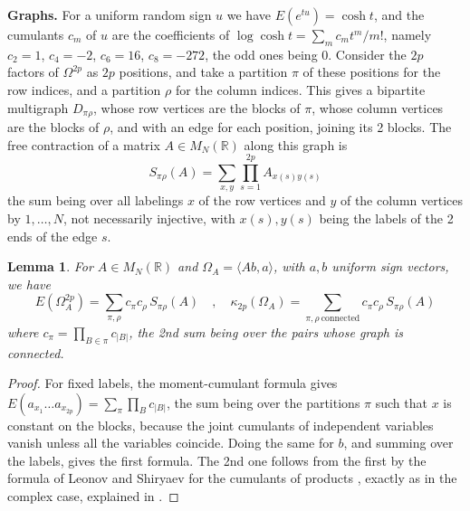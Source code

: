 \documentclass[11pt,a4paper]{article}
\newtheorem{lem}[thm]{Lemma}
\theoremstyle{remark}
\begin{document}
\noindent\textbf{Graphs.}
For a uniform random sign $u$ we have $E(e^{tu})=\cosh t$, and the cumulants $c_m$ of $u$ are the coefficients of $\log\cosh t=\sum_mc_mt^m/m!$, namely $c_2=1$, $c_4=-2$, $c_6=16$, $c_8=-272$, the odd ones being 0. Consider the $2p$ factors of $\Omega^{2p}$ as $2p$ positions, and take a partition $\pi$ of these positions for the row indices, and a partition $\rho$ for the column indices. This gives a bipartite multigraph $D_{\pi\rho}$, whose row vertices are the blocks of $\pi$, whose column vertices are the blocks of $\rho$, and with an edge for each position, joining its 2 blocks. The free contraction of a matrix $A\in M_N(\mathbb R)$ along this graph is
\[
 S_{\pi\rho}(A)=\sum_{x,y}\prod_{s=1}^{2p}A_{x(s)y(s)}
\]
the sum being over all labelings $x$ of the row vertices and $y$ of the column vertices by $1,\ldots,N$, not necessarily injective, with $x(s),y(s)$ being the labels of the 2 ends of the edge $s$.

\begin{samepage}
\begin{lem}\label{lem:graphs}
For $A\in M_N(\mathbb R)$ and $\Omega_A=\langle Ab,a\rangle$, with $a,b$ uniform sign vectors, we have
\[
 E(\Omega_A^{2p})=\sum_{\pi,\rho}c_\pi c_\rho\,S_{\pi\rho}(A)\quad,\quad\kappa_{2p}(\Omega_A)=\sum_{\pi,\rho\ \mathrm{connected}}c_\pi c_\rho\,S_{\pi\rho}(A)
\]
where $c_\pi=\prod_{B\in\pi}c_{|B|}$, the 2nd sum being over the pairs whose graph is connected.
\end{lem}
\end{samepage}

\begin{proof}
For fixed labels, the moment-cumulant formula gives $E(a_{x_1}\ldots a_{x_{2p}})=\sum_\pi\prod_Bc_{|B|}$, the sum being over the partitions $\pi$ such that $x$ is constant on the blocks, because the joint cumulants of independent variables vanish unless all the variables coincide. Doing the same for $b$, and summing over the labels, gives the first formula. The 2nd one follows from the first by the formula of Leonov and Shiryaev for the cumulants of products \cite{lsh}, exactly as in the complex case, explained in \cite{cot}.
\end{proof}
\end{document}
